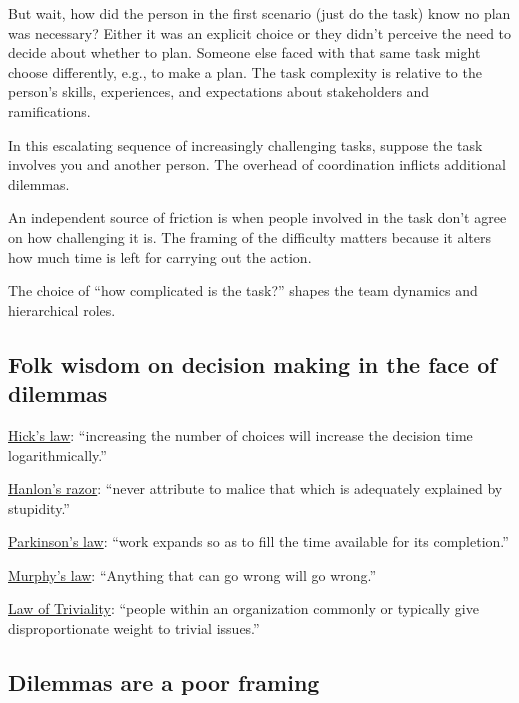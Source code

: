 But wait, how did the person in the first scenario (just do the task) know no plan was necessary? Either it was an explicit choice or they didn't perceive the need to decide about whether to plan. Someone else faced with that same task might choose differently, e.g., to make a plan. The task complexity is relative to the person's skills, experiences, and expectations about stakeholders and ramifications.

In this escalating sequence of increasingly challenging tasks, suppose the task involves you and another person. The overhead of coordination inflicts additional dilemmas. 

An independent source of friction is when people involved in the task don't agree on how challenging it is. The framing of the difficulty matters because it alters how much time is left for carrying out the action. 

The choice of ``how complicated is the task?'' shapes the team dynamics and hierarchical roles. 

\subsection{Folk wisdom on decision making in the face of dilemmas}

\href{https://en.wikipedia.org/wiki/Hick\%27s_law}{Hick's law}: ``increasing the number of choices will increase the decision time logarithmically.''

\href{https://en.wikipedia.org/wiki/Hanlon\%27s_razor}{Hanlon's razor}: ``never attribute to malice that which is adequately explained by stupidity.''

\href{https://en.wikipedia.org/wiki/Parkinson\%27s_law}{Parkinson's law}: ``work expands so as to fill the time available for its completion.''

\href{https://en.wikipedia.org/wiki/Murphy\%27s_law}{Murphy's law}: ``Anything that can go wrong will go wrong.''

\href{https://en.wikipedia.org/wiki/Law_of_triviality}{Law of Triviality}: ``people within an organization commonly or typically give disproportionate weight to trivial issues.''


\subsection{Dilemmas are a poor framing}

